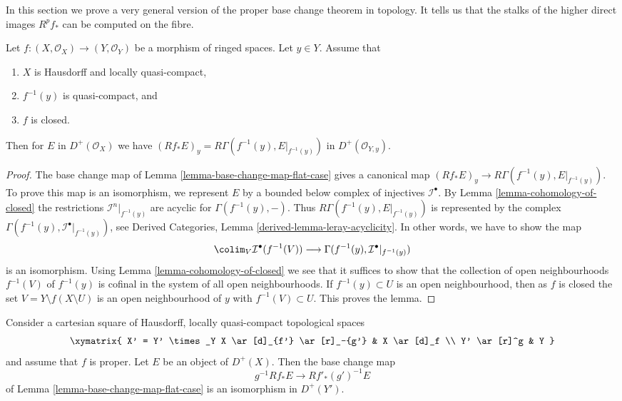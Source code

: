 \noindent
In this section we prove a very general version of the proper base change
theorem in topology. It tells us that the stalks of the higher direct
images $R^pf_*$ can be computed on the fibre.

\begin{lemma}
\label{lemma-proper-base-change}
Let $f : (X, \mathcal{O}_X) \to (Y, \mathcal{O}_Y)$ be a morphism of
ringed spaces. Let $y \in Y$. Assume that
\begin{enumerate}
\item $X$ is Hausdorff and locally quasi-compact,
\item $f^{-1}(y)$ is quasi-compact, and
\item $f$ is closed.
\end{enumerate}
Then for $E$ in $D^+(\mathcal{O}_X)$
we have $(Rf_*E)_y = R\Gamma(f^{-1}(y), E|_{f^{-1}(y)})$ in
$D^+(\mathcal{O}_{Y, y})$.
\end{lemma}

\begin{proof}
The base change map of Lemma \ref{lemma-base-change-map-flat-case}
gives a canonical map $(Rf_*E)_y \to R\Gamma(f^{-1}(y), E|_{f^{-1}(y)})$.
To prove this map is an isomorphism, we represent $E$ by a bounded
below complex of injectives
$\mathcal{I}^\bullet$. By Lemma \ref{lemma-cohomology-of-closed}
the restrictions
$\mathcal{I}^n|_{f^{-1}(y)}$ are acyclic for $\Gamma(f^{-1}(y), -)$.
Thus $R\Gamma(f^{-1}(y), E|_{f^{-1}(y)})$ is represented by the
complex $\Gamma(f^{-1}(y), \mathcal{I}^\bullet|_{f^{-1}(y)})$, see
Derived Categories, Lemma \ref{derived-lemma-leray-acyclicity}.
In other words, we have to show the map
$$
\colim_V \mathcal{I}^\bullet(f^{-1}(V))
\longrightarrow
\Gamma(f^{-1}(y), \mathcal{I}^\bullet|_{f^{-1}(y)})
$$
is an isomorphism. Using Lemma \ref{lemma-cohomology-of-closed}
we see that it suffices to show that the collection of open neighbourhoods
$f^{-1}(V)$ of $f^{-1}(y)$ is cofinal in the system of all open neighbourhoods.
If $f^{-1}(y) \subset U$ is an open neighbourhood, then as $f$ is closed
the set $V = Y \setminus f(X \setminus U)$ is an open neighbourhood
of $y$ with $f^{-1}(V) \subset U$. This proves the lemma.
\end{proof}

\begin{theorem}
\label{theorem-proper-base-change}
Consider a cartesian square of Hausdorff, locally quasi-compact
topological spaces
$$
\xymatrix{
X' = Y' \times_Y X \ar[d]_{f'} \ar[r]_-{g'} & X \ar[d]_f \\
Y' \ar[r]^g & Y
}
$$
and assume that $f$ is proper.
Let $E$ be an object of $D^+(X)$. Then the base change map
$$
g^{-1}Rf_*E \longrightarrow Rf'_*(g')^{-1}E
$$
of Lemma \ref{lemma-base-change-map-flat-case} is an isomorphism
in $D^+(Y')$.
\end{theorem}


